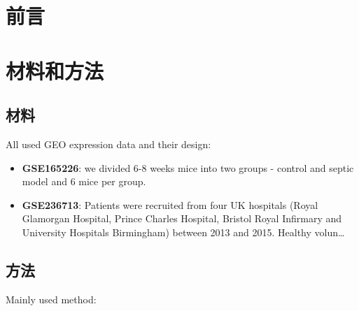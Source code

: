 \documentclass[
]{article}
\begin{document}
\hypertarget{introduction}{%
\section{前言}\label{introduction}}

\hypertarget{methods}{%
\section{材料和方法}\label{methods}}

\hypertarget{ux6750ux6599}{%
\subsection{材料}\label{ux6750ux6599}}

All used GEO expression data and their design:

\begin{itemize}
\item
  \textbf{GSE165226}: we divided 6-8 weeks mice into two groups - control and septic model and 6 mice per group.
\item
  \textbf{GSE236713}: Patients were recruited from four UK hospitals (Royal Glamorgan Hospital, Prince Charles Hospital, Bristol Royal Infirmary and University Hospitals Birmingham) between 2013 and 2015. Healthy volun\ldots{}
\end{itemize}

\hypertarget{ux65b9ux6cd5}{%
\subsection{方法}\label{ux65b9ux6cd5}}

Mainly used method:
\end{document}
